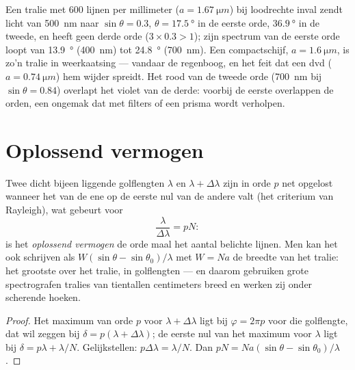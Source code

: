 \begin{example}\label{ex:b2:gratings:examples}
Een tralie met $600$ lijnen per millimeter ($a = \qty{1.67}{\micro m}$) bij
loodrechte
inval zendt licht van \qty{500}{nm} naar $\sin\theta = 0.3$,
$\theta = \qty{17.5}{\degree}$ in
de eerste orde, $\qty{36.9}{\degree}$ in de tweede, en heeft geen derde orde
($3 \times 0.3 > 1$); zijn spectrum van de eerste orde loopt van \qty{13.9}{\degree}
(\qty{400}{nm}) tot \qty{24.8}{\degree} (\qty{700}{nm}). Een compactschijf,
$a =
\qty{1.6}{\micro m}$, is zo'n tralie in weerkaatsing --- vandaar de
regenboog,
en het feit dat een dvd ($a = \qty{0.74}{\micro m}$) hem wijder spreidt. Het
rood van de tweede orde (\qty{700}{nm} bij $\sin\theta = 0.84$) overlapt het violet
van de derde: voorbij de eerste overlappen de orden, een ongemak dat met filters
of een prisma wordt verholpen.
\end{example}

\section{Oplossend vermogen}

\begin{proposition}\label{prop:b2:gratings:resolution}
Twee dicht bijeen liggende golflengten $\lambda$ en
$\lambda + \Delta\lambda$ zijn in orde $p$ net opgelost
wanneer het  van de ene op de eerste nul van de andere valt
(het criterium van Rayleigh), wat gebeurt voor
\[
\frac\lambda{\Delta\lambda} = pN :
\]
is het \emph{oplossend vermogen} de orde maal het aantal belichte
lijnen. Men kan het ook schrijven als $W(\sin\theta - \sin\theta_0)/\lambda$
met $W = Na$ de
breedte van het tralie: het grootste  over het tralie,
in golflengten --- en daarom gebruiken grote spectrografen tralies van tientallen
centimeters breed en werken zij onder scherende hoeken.
\end{proposition}

\begin{proof}
Het maximum van orde $p$ voor $\lambda + \Delta\lambda$ ligt bij
$\varphi = 2\pi p$ voor die
golflengte, dat wil zeggen bij $\delta = p(\lambda + \Delta\lambda)$; de
eerste nul van het maximum
voor $\lambda$ ligt bij $\delta = p\lambda + \lambda/N$. Gelijkstellen:
$p\Delta\lambda = \lambda/N$. Dan
$pN =
Na(\sin\theta - \sin\theta_0)/\lambda$.
\end{proof}

